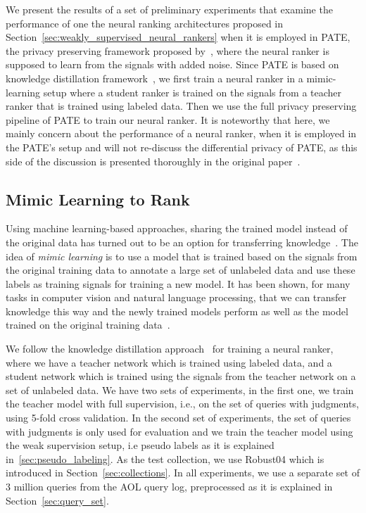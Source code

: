 We present the results of a set of preliminary experiments that examine the performance of one the neural ranking architectures proposed in Section~\ref{sec:weakly_supervised_neural_rankers} when it is employed in PATE, the privacy preserving framework proposed by~\citet{Papernot:2017}, where the neural ranker is supposed to learn from the signals with added noise. 
Since PATE is based on knowledge distillation framework~\cite{Hinton:2015}, we first train a neural ranker in a mimic-learning setup where a student ranker is trained on the signals from a teacher ranker that is trained using labeled data. Then we use the full privacy preserving pipeline of PATE to train our neural ranker.
%
It is noteworthy that here, we mainly concern about the performance of a neural ranker, when it is employed in the PATE's setup and will not re-discuss the differential privacy of PATE, as this side of the discussion is presented thoroughly in the original paper~\citep{Papernot:2017}.

\subsection{Mimic Learning to Rank}
\label{sec:mimic_learning_to_rank}
Using machine learning-based approaches, sharing the trained model instead of the original data has turned out to be an option for transferring knowledge~\citep{Papernot:2017,Shokri:2015,Abadi:2016}. 
The idea of \emph{mimic learning} is to use a model that is trained based on the signals from the original training data to annotate a large set of unlabeled data and use these labels as training signals for training a new model. 
It has been shown, for many tasks in computer vision and natural language processing, that we can transfer knowledge this way and the newly trained models perform as well as the model trained on the original training data~\citep{Bucilua:2006,Hinton:2015,Romero:2014,Ba:2014}.

We follow the knowledge distillation approach~\cite{Hinton:2015} for training a neural ranker, where we have a teacher network which is trained using labeled data, and a student network which is trained using the signals from the teacher network on a set of unlabeled data. We have two sets of experiments, in the first one, we train the teacher model with full supervision, i.e., on the set of queries with judgments, using 5-fold cross validation. 
In the second set of experiments, the set of queries with judgments is only used for evaluation and we train the teacher model using the weak supervision setup, i.e pseudo labels as it is explained in~\ref{sec:pseudo_labeling}. 
As the test collection, we use Robust04 which is introduced in Section~\ref{sec:collections}. In all experiments, we use a separate set of $3$ million queries from the AOL query log, preprocessed as it is explained in Section~\ref{sec:query_set}.

